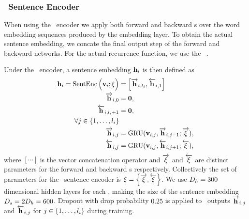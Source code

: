 \subsubsection{\RecurrentNeuralNetwork~Sentence Encoder} 

    When using the \recurrentneuralnetwork~encoder we apply both forward 
    and backward \recurrentneuralnetwork s over the word embedding sequences
    produced by the embedding layer. To obtain the actual sentence embedding, 
    we concate the final output step of
    the forward and backward networks. 
    For the actual recurrence function, we use the 
    \gatedrecurrentunit~\citep{cho2014gru}. 
    

    Under the \recurrentneuralnetwork~encoder, a sentence embedding 
    $\mathbf{h}_i$ is then defined as
    \begin{align} 
        \mathbf{h}_i 
        = \operatorname{SentEnc}\Big(\mathbf{v}_i; \xi\Big) & = \left[
                \overrightarrow{\mathbf{h}}_{i,l_i}, \overleftarrow{\mathbf{h}}_{i,1}
            \right] \\
            \overrightarrow{\mathbf{h}}_{i,0}  &= \mathbf{0}, \\ 
            \overleftarrow{\mathbf{h}}_{i,l_i + 1} &= \mathbf{0}, \\
            \forall j \in \{1,\ldots,l_i\}& \nonumber \\  
           \overrightarrow{\mathbf{h}}_{i,j} & = 
                \operatorname{GRU}(\mathbf{v}_{i,j}, \overrightarrow{\mathbf{h}}_{i,j-1}; \overrightarrow{\xi}), \\
           \overleftarrow{\mathbf{h}}_{i,j} &= 
                \operatorname{GRU}(\mathbf{v}_{i,j},\overleftarrow{\mathbf{h}}_{i,j+1};\overleftarrow{\xi} ),
    \end{align}
    where $[\cdots]$ is the vector concatenation operator and
    $\overrightarrow{\xi}$ and $\overleftarrow{\xi}$ are distinct parameters for 
    the forward and backward \recurrentneuralnetwork s respectively. 
    Collectively the set of parameters for the \recurrentneuralnetwork~sentence
    encoder is $\xi = \left\{ \overrightarrow{\xi}, \overleftarrow{\xi}
    \right\}$. We use $D_{h}=300$ dimensional hidden layers for each \gru, 
    making the size of the sentence embedding $D_{s}=2D_{h}=600$.
    Dropout with drop probability $0.25$ is applied to \gru~outputs $\overrightarrow{\mathbf{h}}_{i,j}$ and $\overleftarrow{\mathbf{h}}_{i,j}$ for 
$j \in \{1,\ldots,l_i\}$ during training.





